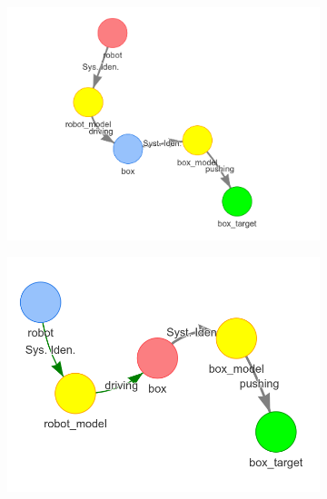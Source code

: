 \begin{figure}[H]
    \begin{subfigure}{.3\textwidth}
    \centering
    \includegraphics[width=1\textwidth]{figures/proposed_method/connecting_nodes/robot_push/robot_push_4}
    \caption{}\label{subfig:robot_push_4}
    \end{subfigure}
    \begin{subfigure}{.3\textwidth}
    \centering
    \includegraphics[width=1.05\textwidth]{figures/proposed_method/connecting_nodes/robot_push/robot_push_5}
    \caption{}\label{subfig:robot_push_5}
    \end{subfigure}
    \begin{subfigure}{.3\textwidth}
    \centering

\end{subfigure}
\end{figure}
